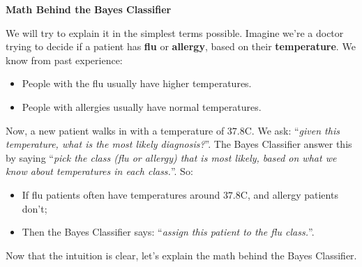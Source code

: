 \highspace
\begin{flushleft}
    \textcolor{Green3}{ \textbf{Math Behind the Bayes Classifier}}
\end{flushleft}
We will try to explain it in the simplest terms possible. Imagine we're a doctor trying to decide if a patient has \textbf{flu} or \textbf{allergy}, based on their \textbf{temperature}. We know from past experience:
\begin{itemize}
    \item People with the flu usually have higher temperatures.
    \item People with allergies usually have normal temperatures.
\end{itemize}
Now, a new patient walks in with a temperature of $37.8$\textdegree C. We ask: ``\emph{given this temperature, what is the most likely diagnosis?}''. The Bayes Classifier answer this by saying ``\emph{pick the class (flu or allergy) that is most likely, based on what we know about temperatures in each class.}''. So:
\begin{itemize}
    \item If flu patients often have temperatures around $37.8$\textdegree C, and allergy patients don't;
    \item Then the Bayes Classifier says: ``\emph{assign this patient to the flu class.}''.
\end{itemize}
Now that the intuition is clear, let's explain the math behind the Bayes Classifier.

